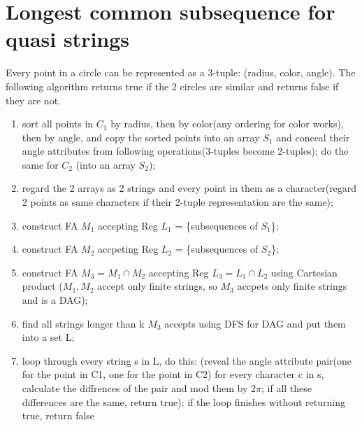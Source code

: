 \documentclass{article}
\begin{document}
\section{Longest common subsequence for quasi strings}
Every point in a circle can be represented as a 3-tuple: (radius, color, angle).
The following algorithm returns true if the 2 circles are similar and returns
false if they are not.
\begin{enumerate}
  \item sort all points in $C_1$ by radius, then by color(any ordering for
  color works), then by angle, and copy the sorted points into an array $S_1$
  and conceal their angle attributes from following operations(3-tuples become
  2-tuples); do the same for $C_2$ (into an array $S_2$);
  \item regard the 2 arrays as 2 strings and every point in them as a
  character(regard 2 points as same characters if their 2-tuple representation
  are the same);
  \item construct FA $M_1$ accepting Reg $L_1$ = \{subsequences of $S_1$\};
  \item construct FA $M_2$ accpeting Reg $L_2$ = \{subsequences of $S_2$\};
  \item construct FA $M_3  = M_1 \cap M_2$ accepting Reg $L_3 = L_1 \cap L_2$
  using Cartesian product ($M_1, M_2$ accept only finite strings, so $M_3$
  accpets only finite strings and is a DAG);
  \item find all strings longer than k $M_3$ accepts using DFS for DAG
  and put them into a set L;
  \item loop through every string s in L, do this: (reveal the angle
  attribute pair(one for the point in C1, one for the point in C2) for every character c in s, calculate
  the diffrences of the pair and mod them by $2 \pi$; if all these differences
  are the same, return true); if the loop finishes without returning true,
  return false
\end{enumerate}
\end{document}
